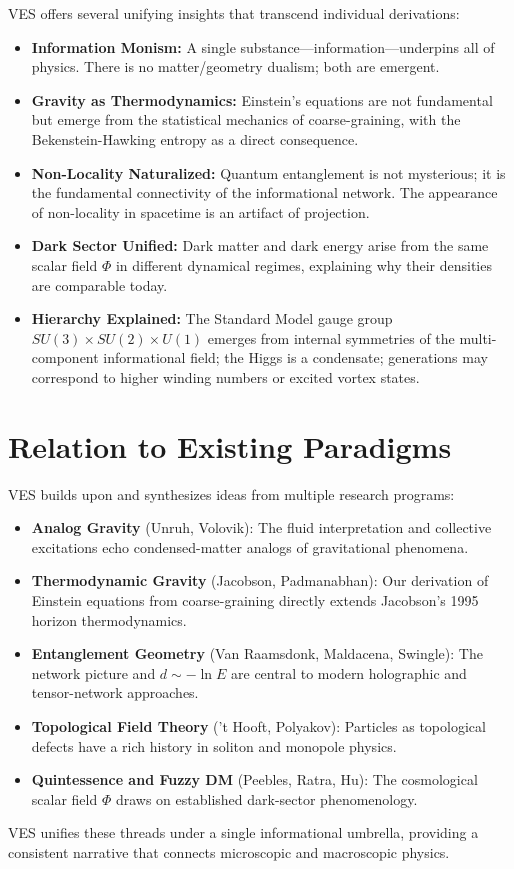 \documentclass[12pt,a4paper]{book}
\begin{document}
VES offers several unifying insights that transcend individual derivations:
\begin{itemize}
    \item \textbf{Information Monism:} A single substance—information—underpins all of physics. There is no matter/geometry dualism; both are emergent.
    \item \textbf{Gravity as Thermodynamics:} Einstein's equations are not fundamental but emerge from the statistical mechanics of coarse-graining, with the Bekenstein-Hawking entropy as a direct consequence.
    \item \textbf{Non-Locality Naturalized:} Quantum entanglement is not mysterious; it is the fundamental connectivity of the informational network. The appearance of non-locality in spacetime is an artifact of projection.
    \item \textbf{Dark Sector Unified:} Dark matter and dark energy arise from the same scalar field $\Phi$ in different dynamical regimes, explaining why their densities are comparable today.
    \item \textbf{Hierarchy Explained:} The Standard Model gauge group $SU(3)\times SU(2)\times U(1)$ emerges from internal symmetries of the multi-component informational field; the Higgs is a condensate; generations may correspond to higher winding numbers or excited vortex states.
\end{itemize}

\section{Relation to Existing Paradigms}

VES builds upon and synthesizes ideas from multiple research programs:
\begin{itemize}
    \item \textbf{Analog Gravity} (Unruh, Volovik): The fluid interpretation and collective excitations echo condensed-matter analogs of gravitational phenomena.
    \item \textbf{Thermodynamic Gravity} (Jacobson, Padmanabhan): Our derivation of Einstein equations from coarse-graining directly extends Jacobson's 1995 horizon thermodynamics.
    \item \textbf{Entanglement Geometry} (Van Raamsdonk, Maldacena, Swingle): The network picture and $d \sim -\ln E$ are central to modern holographic and tensor-network approaches.
    \item \textbf{Topological Field Theory} ('t Hooft, Polyakov): Particles as topological defects have a rich history in soliton and monopole physics.
    \item \textbf{Quintessence and Fuzzy DM} (Peebles, Ratra, Hu): The cosmological scalar field $\Phi$ draws on established dark-sector phenomenology.
\end{itemize}
VES unifies these threads under a single informational umbrella, providing a consistent narrative that connects microscopic and macroscopic physics.
\end{document}
